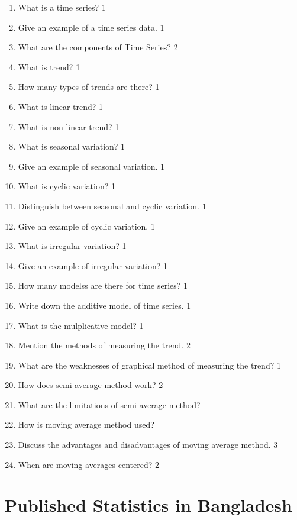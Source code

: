 \documentclass[a4paper,oneside]{book}
\begin{document}
  \begin{enumerate}
    \item What is a time series? \hfill 1
    \item Give an example of a time series data. \hfill 1
    \item What are the components of Time Series?  \hfill 2
    \item What is trend?  \hfill 1
    \item How many types of trends are there? \hfill 1
    \item What is linear trend?  \hfill 1
    \item What is non-linear trend? \hfill 1
    \item What is seasonal variation? \hfill 1
    \item Give an example of seasonal variation. \hfill 1
    \item What is cyclic variation?  \hfill 1
    \item Distinguish between seasonal and cyclic variation. \hfill 1
    \item Give an example of cyclic variation. \hfill 1
    \item What is irregular variation? \hfill 1
    \item Give an example of irregular variation? \hfill 1
    \item How many modelss are there for time series? \hfill 1
    \item Write down the additive model of time series. \hfill 1
    \item What is the mulplicative model? \hfill 1
    \item Mention the methods of measuring the trend. \hfill 2
    \item What are the weaknesses of graphical method of measuring the trend? \hfill 1
    \item How does semi-average method work? \hfill 2
    \item What are the limitations of semi-average method?
    \item How is moving average method used?
    \item Discuss the advantages and disadvantages of moving average method. \hfill 3
    \item When are moving averages centered? \hfill 2
    
     \end{enumerate}

\chapter{Published Statistics in Bangladesh} 
\end{document}
